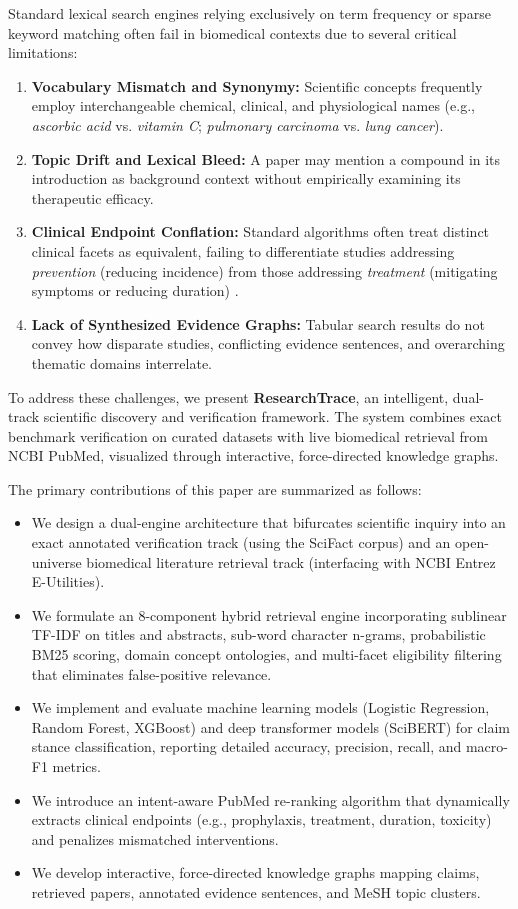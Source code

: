 \documentclass[conference]{IEEEtran}
\begin{document}
Standard lexical search engines relying exclusively on term frequency or sparse keyword matching often fail in biomedical contexts due to several critical limitations:
\begin{enumerate}
    \item \textbf{Vocabulary Mismatch and Synonymy:} Scientific concepts frequently employ interchangeable chemical, clinical, and physiological names (e.g., \textit{ascorbic acid} vs. \textit{vitamin C}; \textit{pulmonary carcinoma} vs. \textit{lung cancer}).
    \item \textbf{Topic Drift and Lexical Bleed:} A paper may mention a compound in its introduction as background context without empirically examining its therapeutic efficacy.
    \item \textbf{Clinical Endpoint Conflation:} Standard algorithms often treat distinct clinical facets as equivalent, failing to differentiate studies addressing \textit{prevention} (reducing incidence) from those addressing \textit{treatment} (mitigating symptoms or reducing duration) \cite{hemila2013vitamin}.
    \item \textbf{Lack of Synthesized Evidence Graphs:} Tabular search results do not convey how disparate studies, conflicting evidence sentences, and overarching thematic domains interrelate.
\end{enumerate}

To address these challenges, we present \textbf{ResearchTrace}, an intelligent, dual-track scientific discovery and verification framework. The system combines exact benchmark verification on curated datasets with live biomedical retrieval from NCBI PubMed, visualized through interactive, force-directed knowledge graphs.

The primary contributions of this paper are summarized as follows:
\begin{itemize}
    \item We design a dual-engine architecture that bifurcates scientific inquiry into an exact annotated verification track (using the SciFact corpus) and an open-universe biomedical literature retrieval track (interfacing with NCBI Entrez E-Utilities).
    \item We formulate an 8-component hybrid retrieval engine incorporating sublinear TF-IDF on titles and abstracts, sub-word character n-grams, probabilistic BM25 scoring, domain concept ontologies, and multi-facet eligibility filtering that eliminates false-positive relevance.
    \item We implement and evaluate machine learning models (Logistic Regression, Random Forest, XGBoost) and deep transformer models (SciBERT) for claim stance classification, reporting detailed accuracy, precision, recall, and macro-F1 metrics.
    \item We introduce an intent-aware PubMed re-ranking algorithm that dynamically extracts clinical endpoints (e.g., prophylaxis, treatment, duration, toxicity) and penalizes mismatched interventions.
    \item We develop interactive, force-directed knowledge graphs mapping claims, retrieved papers, annotated evidence sentences, and MeSH topic clusters.
\end{itemize}
\end{document}
